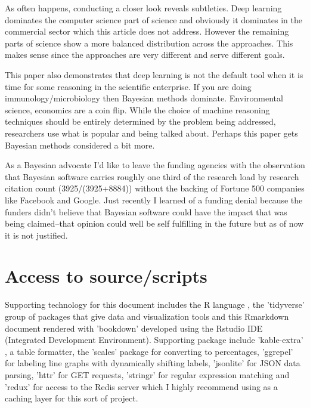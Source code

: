\documentclass[AMA,STIX1COL]{WileyNJD-v2}
\begin{document}
As often happens, conducting a closer look reveals subtleties. Deep learning dominates the computer science part of science and obviously it dominates in the commercial sector which this article does not address. However the remaining parts of science show a more balanced distribution across the approaches. This makes sense since the approaches are very different and serve different goals. 

This paper also demonstrates that deep learning is not the default tool when it is time for some reasoning in the scientific enterprise. If you are doing immunology/microbiology then Bayesian methods dominate. Environmental science, economics are a coin flip. While the choice of machine reasoning techniques should be entirely determined by the problem being addressed, researchers use what is popular and being talked about. Perhaps this paper gets Bayesian methods considered a bit more.

As a Bayesian advocate I'd like to leave the funding agencies with the observation that Bayesian software carries roughly one third of the research load by research citation count (3925/(3925+8884)) without the backing of Fortune 500 companies like Facebook and Google. Just recently I learned of a funding denial because the funders didn't believe that Bayesian software could have the impact that was being claimed--that opinion could well be self fulfilling in the future but as of now it is not justified. 

\section{Access to source/scripts}

Supporting technology for this document includes the R language \cite{Rcite}, the 'tidyverse' group of packages \cite{tidyverse} that give data and visualization tools and this Rmarkdown document \cite{rmarkdown} rendered with 'bookdown' \cite{bookdown} developed using the Rstudio \cite{rstudio} IDE (Integrated Development Environment). Supporting package include 'kable-extra' \cite{kable-extra}, a table formatter, the 'scales' \cite{scales} package for converting to percentages, 'ggrepel' \cite{ggrepel} for labeling line graphs with dynamically shifting labels, 'jsonlite' \cite{jsonlite} for JSON data parsing, 'httr' \cite{httr} for GET requests, 'stringr' \cite{stringr} for regular expression matching and 'redux' \cite{redux} for access to the Redis server \cite{redis} which I highly recommend using as a caching layer for this sort of project. 
\end{document}
